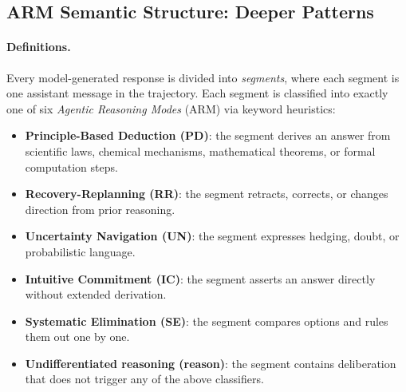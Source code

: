 %

\subsection{ARM Semantic Structure: Deeper Patterns}
\label{appendix:macro-gpqa-arm-deep}

\paragraph{Definitions.}
Every model-generated response is divided into \emph{segments}, where each
segment is one assistant message in the trajectory.
Each segment is classified into exactly one of six \emph{Agentic Reasoning
Modes} (ARM) via keyword heuristics:
\begin{itemize}[leftmargin=*, itemsep=1pt]
\item \textbf{Principle-Based Deduction (PD)}: the segment derives an answer
  from scientific laws, chemical mechanisms, mathematical theorems, or
  formal computation steps.
\item \textbf{Recovery-Replanning (RR)}: the segment retracts, corrects, or
  changes direction from prior reasoning.
\item \textbf{Uncertainty Navigation (UN)}: the segment expresses hedging,
  doubt, or probabilistic language.
\item \textbf{Intuitive Commitment (IC)}: the segment asserts an answer
  directly without extended derivation.
\item \textbf{Systematic Elimination (SE)}: the segment compares options
  and rules them out one by one.
\item \textbf{Undifferentiated reasoning (reason)}: the segment contains
  deliberation that does not trigger any of the above classifiers.
\end{itemize}

